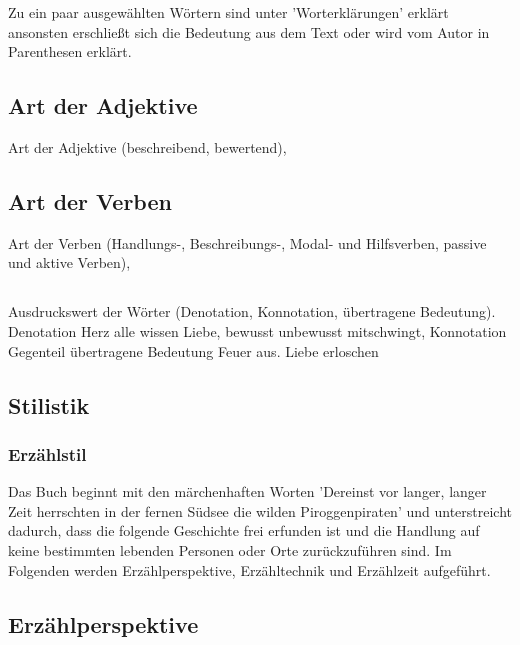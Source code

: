 {Zu ein paar ausgewählten Wörtern sind unter 'Worterklärungen' erklärt \cite[S.647]{pir} ansonsten erschließt sich die Bedeutung aus dem Text oder wird vom Autor in Parenthesen erklärt.


\subsection{Art der Adjektive}
Art der Adjektive (beschreibend, bewertend),

\subsection{Art der Verben}
Art der Verben (Handlungs-, Beschreibungs-, Modal- und Hilfsverben, passive und aktive Verben),

\subsection{   }
Ausdruckswert der Wörter (Denotation, Konnotation, übertragene Bedeutung).
Denotation Herz alle wissen Liebe, bewusst unbewusst mitschwingt, Konnotation Gegenteil
übertragene Bedeutung Feuer aus. Liebe erloschen



\subsection{Stilistik}

\subsubsection{Erzählstil}


Das Buch beginnt mit den märchenhaften Worten 'Dereinst vor langer, langer Zeit herrschten in der fernen Südsee die wilden Piroggenpiraten'\cite[S.7]{pir} und unterstreicht dadurch, dass die folgende Geschichte frei erfunden ist und die Handlung auf keine bestimmten lebenden Personen oder Orte zurückzuführen sind. 
Im Folgenden werden Erzählperspektive, Erzähltechnik und Erzählzeit aufgeführt.

\subsection{Erzählperspektive}

}
